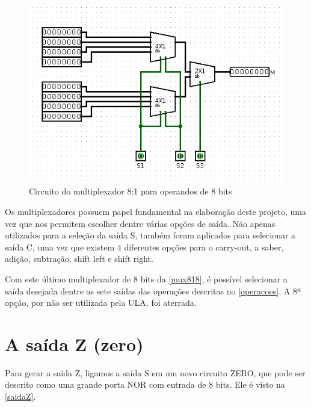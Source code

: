 \documentclass[
	12pt,				%
	openright,			%
	twoside,			%
	a4paper,			%
	english,			%
	french,				%
	spanish,			%
	brazil,				%
	]{abntex2}
\begin{document}
\begin{figure}[H]
	\begin{center}
	    \includegraphics[scale=0.7]{mux818.png}
	\end{center}
\caption{\label{mux818}Circuito do multiplexador 8:1 para operandos de 8 bits}
\end{figure}

Os multiplexadores possuem papel fundamental na elaboração deste projeto, uma vez que nos permitem escolher dentre várias opções de saída. Não apenas utilizados para a seleção da saída S, também foram aplicados para selecionar a saída C, uma vez que existem 4 diferentes opções para o carry-out, a saber, adição, subtração, shift left e shift right.

Com este último multiplexador de 8 bits da \autoref{mux818}, é possível selecionar a saída desejada dentre as sete saídas das operações descritas no \autoref{operacoes}. A 8ª opção, por não ser utilizada pela ULA, foi aterrada.

\section{A saída Z (zero)}

Para gerar a saída Z, ligamos a saída S em um novo circuito ZERO, que pode ser descrito como uma grande porta NOR com entrada de 8 bits. Ele é visto na \autoref{saidaZ}.
\end{document}
